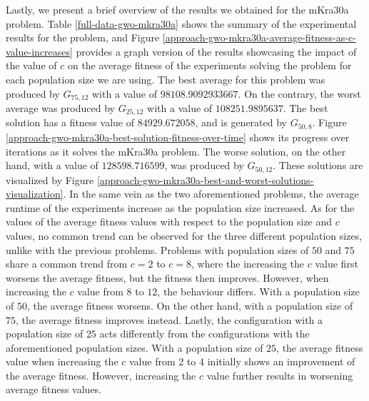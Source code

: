 Lastly, we present a brief overview of the results we obtained for the mKra30a problem. Table \ref{full-data-gwo-mkra30a} shows the summary of the experimental results for the problem, and Figure \ref{approach-gwo-mkra30a-average-fitness-as-c-value-increases} provides a graph version of the results showcasing the impact of the value of $c$ on the average fitness of the experiments solving the problem for each population size we are using. The best average for this problem was produced by $G_{75,12}$ with a value of $98108.9092933667$. On the contrary, the worst average was produced by $G_{25,12}$ with a value of $108251.9895637$. The best solution has a fitness value of $84929.672058$, and is generated by $G_{50,8}$. Figure \ref{approach-gwo-mkra30a-best-solution-fitness-over-time} shows its progress over iterations as it solves the mKra30a problem. The worse solution, on the other hand, with a value of $128598.716599$, was produced by $G_{50,12}$. These solutions are visualized by Figure \ref{approach-gwo-mkra30a-best-and-worst-solutions-visualization}. In the same vein as the two aforementioned problems, the average runtime of the experiments increase as the population size increased. As for the values of the average fitness values with respect to the population size and $c$ values, no common trend can be observed for the three different population sizes, unlike with the previous problems. Problems with population sizes of $50$ and $75$ share a common trend from $c = 2$ to $c = 8$, where the increasing the $c$ value first worsens the average fitness, but the fitness then improves. However, when increasing the $c$ value from $8$ to $12$, the behaviour differs. With a population size of $50$, the average fitness worsens. On the other hand, with a population size of $75$, the average fitness improves instead. Lastly, the configuration with a population size of $25$ acts differently from the configurations with the aforementioned population sizes. With a population size of $25$, the average fitness value when increasing the $c$ value from $2$ to $4$ initially shows an improvement of the average fitness. However, increasing the $c$ value further results in worsening average fitness values.

